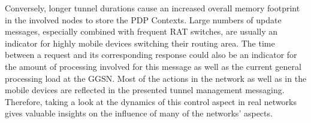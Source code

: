 Conversely, longer tunnel durations cause an increased overall memory footprint in the involved nodes to store the \gls{PDP} Contexts. Large numbers of update messages, especially combined with frequent \gls{RAT} switches, are usually an indicator for highly mobile devices switching their routing area. The time between a request and its corresponding response could also be an indicator for the amount of processing involved for this message as well as the current general processing load at the \gls{GGSN}. Most of the actions in the network as well as in the mobile devices are reflected in the presented tunnel management messaging. Therefore, taking a look at the dynamics of this control aspect in real networks gives valuable insights on the influence of many of the networks' aspects.











